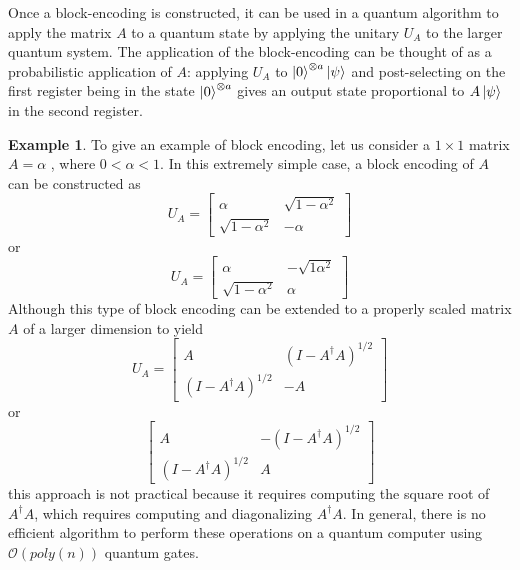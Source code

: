 \documentclass[12pt, oneside]{book}
\theoremstyle{definition}
\theoremstyle{definition}
\newtheorem{example}{Example}[section]
\theoremstyle{remark}
\begin{document}
Once a block-encoding is constructed, it can be used in a quantum algorithm to apply the matrix $A$ to a quantum state by applying the unitary $U_A$ to the larger quantum system. The application of the block-encoding can be thought of as a probabilistic application of $A$: applying $U_A$ to $\ket{0}^{\otimes a}\ket{\psi}$ and post-selecting on the first register being in the state $\ket{0}^{\otimes a}$ gives an output state proportional to $A\ket{\psi}$ in the second register.

\begin{example}
    To give an example of block encoding, let us consider a $1 \times 1$ matrix $A=\alpha$ , where $0<\alpha<1$. In this extremely simple case, a block encoding of $A$ can be constructed as
    \[
    U_A=\begin{bmatrix} \alpha & \sqrt{1-\alpha^2} \\ 
    \sqrt{1-\alpha^2} & -\alpha \end{bmatrix}
    \]
    or
    \[
    U_A =\begin{bmatrix} \alpha & -\sqrt{1\alpha^2} \\ 
    \sqrt{1-\alpha^2} & \alpha \end{bmatrix}
    \]
    Although this type of block encoding can be extended to a properly scaled matrix $A$ of a larger dimension to yield
    \[
    U_A =\begin{bmatrix} A & (I-A^{\dagger}A)^{1/2} \\ (I-A^{\dagger}A)^{1/2} & -A \end{bmatrix}
    \]
    or
    \[
    \begin{bmatrix} A & -(I-A^{\dagger}A)^{1/2} \\ 
    (I-A^{\dagger}A)^{1/2} & A \end{bmatrix}
    \]
    this approach is not practical because it requires computing the square root of $A^{\dagger}A$, which requires computing and diagonalizing $A^{\dagger}A$. In general, there is no efficient algorithm to perform these operations on a quantum computer using $\mathcal{O}(poly(n))$ quantum gates.
\end{example}
\end{document}
